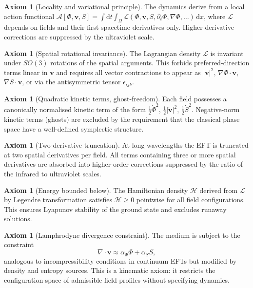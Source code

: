 \documentclass[12pt, a4paper]{article}
\theoremstyle{plain}
\theoremstyle{definition}
\newtheorem{axiom}[theorem]{Axiom}
\theoremstyle{remark}
\newcommand{\vfield}{\mathbf{v}}
\newcommand{\divv}{\nabla\!\cdot\!\vfield}
\begin{document}
\begin{axiom}[Locality and variational principle]
\label{ax:locality}
The dynamics derive from a local action functional
$\mathcal{A}[\Phi, \vfield, S] = \int \mathrm{d}t\int_\Omega \mathcal{L}(\Phi, \vfield, S, \partial_t\Phi, \nabla\Phi, \ldots)\,\mathrm{d}x$,
where $\mathcal{L}$ depends on fields and their first spacetime derivatives only.
Higher-derivative corrections are suppressed by the ultraviolet scale.
\end{axiom}

\begin{axiom}[Spatial rotational invariance]
\label{ax:rotation}
The Lagrangian density $\mathcal{L}$ is invariant under $SO(3)$ rotations of the
spatial arguments.  This forbids preferred-direction terms linear in $\vfield$ and
requires all vector contractions to appear as $|\vfield|^2$, $\nabla\Phi \cdot \vfield$,
$\nabla S \cdot \vfield$, or via the antisymmetric tensor $\epsilon_{ijk}$.
\end{axiom}

\begin{axiom}[Quadratic kinetic terms, ghost-freedom]
\label{ax:kinetic}
Each field possesses a canonically normalised kinetic term of the form
$\tfrac{1}{2}\dot{\Phi}^2$, $\tfrac{1}{2}|\dot{\vfield}|^2$, $\tfrac{1}{2}\dot{S}^2$.
Negative-norm kinetic terms (ghosts) are excluded by the requirement that the
classical phase space have a well-defined symplectic structure.
\end{axiom}

\begin{axiom}[Two-derivative truncation]
\label{ax:twoderiv}
At long wavelengths the EFT is truncated at two spatial derivatives per field.
All terms containing three or more spatial derivatives are absorbed into
higher-order corrections suppressed by the ratio of the infrared to ultraviolet
scales.
\end{axiom}

\begin{axiom}[Energy bounded below]
\label{ax:stability}
The Hamiltonian density $\mathcal{H}$ derived from $\mathcal{L}$ by Legendre
transformation satisfies $\mathcal{H} \geq 0$ pointwise for all field configurations.
This ensures Lyapunov stability of the ground state and excludes runaway solutions.
\end{axiom}

\begin{axiom}[Lamphrodyne divergence constraint]
\label{ax:constraint}
The medium is subject to the constraint
\begin{equation}
\divv \approx \alpha_\Phi \Phi + \alpha_S S,
\label{eq:constraint}
\end{equation}
analogous to incompressibility conditions in continuum EFTs \cite{Nicolis2013} but
modified by density and entropy sources.  This is a kinematic axiom: it restricts
the configuration space of admissible field profiles without specifying dynamics.
\end{axiom}
\end{document}
